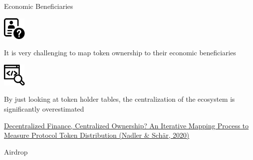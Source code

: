 \documentclass[handout]{beamer}
\begin{document}
\begin{frame}{Economic Beneficiaries}
\vspace{2 em}
		\begin{minipage}{0.2\textwidth}
			\begin{center}
				\includegraphics[height=3em]{../assets/images/unknown.png}
			\end{center}
		\end{minipage}
		\hspace{1 em}
		\begin{minipage}{0.72\textwidth}
		It is very challenging to map token ownership to their economic beneficiaries
		\end{minipage}
		\pause
		\vspace{2 em}
		

		\begin{minipage}{0.2\textwidth}
			\begin{center}
				\includegraphics[height=3em]{../assets/images/code-review.png}
			\end{center}
		\end{minipage}
		\hspace{1 em}
		\begin{minipage}{0.72\textwidth}
		By just looking at token holder tables, the centralization of the ecosystem is significantly overestimated
		\end{minipage}
		\pause
		\vspace{3em}		
		
		\pause
		
		
		\link \href{https://arxiv.org/pdf/2012.09306}{Decentralized Finance, Centralized Ownership? An Iterative Mapping Process to Measure Protocol Token Distribution (Nadler \& Sch{\"a}r, 2020)}
\end{frame}



\begin{frame}{Airdrop}
\begin{figure}
\scalebox{0.7}{
	\begin{tikzpicture}
		
	\end{tikzpicture}	
}
\end{figure}

\end{frame}
\end{document}
